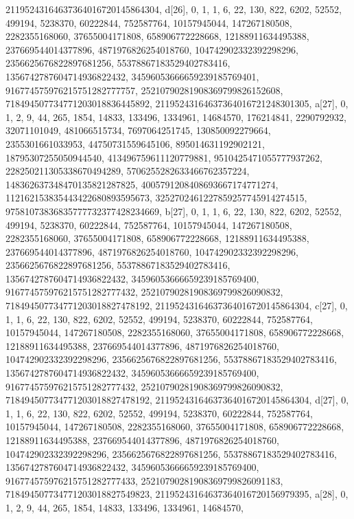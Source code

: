 {{{   21195243164637364016720145864304}}, 
 {d[26], {0, 1, 1, 6, 22, 130, 822, 6202, 52552, 499194, 5238370, 60222844, 
   752587764, 10157945044, 147267180508, 2282355168060, 37655004171808, 
   658906772228668, 12188911634495388, 237669544014377896, 
   4871976826254018760, 104742902332392298296, 2356625676822897681256, 
   55378867183529402783416, 1356742787604714936822432, 
   34596053666659239185769401, 916774575976215751282777757, 
   25210790281908369799826152608, 718494507734771203018836445892, 
   21195243164637364016721248301305}}, 
 {a[27], {0, 1, 2, 9, 44, 265, 1854, 14833, 133496, 1334961, 14684570, 
   176214841, 2290792932, 32071101049, 481066515734, 7697064251745, 
   130850092279664, 2355301661033953, 44750731559645106, 895014631192902121, 
   18795307255050944540, 413496759611120779881, 9510425471055777937262, 
   228250211305338670494289, 5706255282633466762357224, 
   148362637348470135821287825, 4005791208408693667174771274, 
   112162153835443422680893595673, 3252702461227859257745914274515, 
   97581073836835777732377428234669}}, 
 {b[27], {0, 1, 1, 6, 22, 130, 822, 6202, 52552, 499194, 5238370, 60222844, 
   752587764, 10157945044, 147267180508, 2282355168060, 37655004171808, 
   658906772228668, 12188911634495388, 237669544014377896, 
   4871976826254018760, 104742902332392298296, 2356625676822897681256, 
   55378867183529402783416, 1356742787604714936822432, 
   34596053666659239185769400, 916774575976215751282777432, 
   25210790281908369799826090832, 718494507734771203018827478192, 
   21195243164637364016720145864304}}, 
 {c[27], {0, 1, 1, 6, 22, 130, 822, 6202, 52552, 499194, 5238370, 60222844, 
   752587764, 10157945044, 147267180508, 2282355168060, 37655004171808, 
   658906772228668, 12188911634495388, 237669544014377896, 
   4871976826254018760, 104742902332392298296, 2356625676822897681256, 
   55378867183529402783416, 1356742787604714936822432, 
   34596053666659239185769400, 916774575976215751282777432, 
   25210790281908369799826090832, 718494507734771203018827478192, 
   21195243164637364016720145864304}}, 
 {d[27], {0, 1, 1, 6, 22, 130, 822, 6202, 52552, 499194, 5238370, 60222844, 
   752587764, 10157945044, 147267180508, 2282355168060, 37655004171808, 
   658906772228668, 12188911634495388, 237669544014377896, 
   4871976826254018760, 104742902332392298296, 2356625676822897681256, 
   55378867183529402783416, 1356742787604714936822432, 
   34596053666659239185769400, 916774575976215751282777433, 
   25210790281908369799826091183, 718494507734771203018827549823, 
   21195243164637364016720156979395}}, 
 {a[28], {0, 1, 2, 9, 44, 265, 1854, 14833, 133496, 1334961, 14684570, 
}}}
